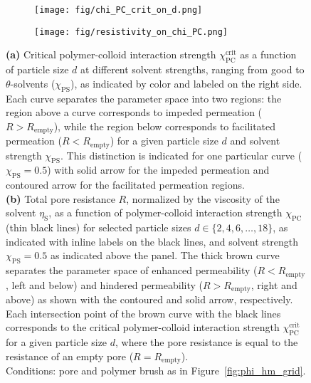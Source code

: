 \documentclass[12pt, a4paper]{article}
\begin{document}
\begin{figure}
    \centering
    \begin{subfigure}[b]{0.52\textwidth}
        \texttt{[image: fig/chi\_PC\_crit\_on\_d.png]}
        \caption{}
    \end{subfigure}%
    \hspace{0.03\textwidth}
    \begin{subfigure}[b]{0.4\textwidth}
        \texttt{[image: fig/resistivity\_on\_chi\_PC.png]}
        \caption{}
    \end{subfigure}
    \caption{
        \textbf{(a)} Critical polymer-colloid interaction strength $\chi_{\textrm{PC}}^{\textrm{crit}}$ as a function of particle size $d$ at different solvent strengths, ranging from good to $\theta$-solvents ($\chi_{\textrm{PS}}$), as indicated by color and labeled on the right side.
        Each curve separates the parameter space into two regions: the region above a curve corresponds to impeded permeation ($R > R_{\text{empty}}$), while the region below corresponds to facilitated permeation ($R < R_{\text{empty}}$) for a given particle size $d$ and solvent strength $\chi_{\textrm{PS}}$.
        This distinction is indicated for one particular curve ($\chi_{\textrm{PS}}=0.5$) with solid arrow for the impeded permeation and contoured arrow for the facilitated permeation regions.
        \\
        \textbf{(b)} Total pore resistance $R$, normalized by the viscosity of the solvent $\eta_\text{S}$, as a function of polymer-colloid interaction strength $\chi_{\textrm{PC}}$ (thin black lines) for selected particle sizes $d \in \{2, 4, 6, \dots, 18\}$, as indicated with inline labels on the black lines, and solvent strength $\chi_{\textrm{PS}}=0.5$ as indicated above the panel.
        The thick brown curve separates the parameter space of enhanced permeability ($R < R_{\textrm{empty}}$, left and below) and hindered permeability ($R > R_{\textrm{empty}}$, right and above) as shown with the contoured and solid arrow, respectively.
        Each intersection point of the brown curve with the black lines corresponds to the critical polymer-colloid interaction strength $\chi_{\textrm{PC}}^{\textrm{crit}}$ for a given particle size $d$, where the pore resistance is equal to the resistance of an empty pore ($R = R_{\textrm{empty}}$).
        \\
        Conditions: pore and polymer brush as in Figure~\ref{fig:phi_hm_grid}.
    }
    \label{fig:R_vs_chi_PC}
\end{figure}
\end{document}
